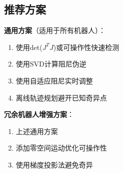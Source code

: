 \documentclass[12pt,a4paper]{article}
\begin{document}
\subsection{推荐方案}

\textbf{通用方案}（适用于所有机器人）：
\begin{enumerate}
\item 使用det($J^T J$)或可操作性快速检测
\item 使用SVD计算阻尼伪逆
\item 使用自适应阻尼实时调整
\item 离线轨迹规划避开已知奇异点
\end{enumerate}

\textbf{冗余机器人增强方案}：
\begin{enumerate}
\item 上述通用方案
\item 添加零空间运动优化可操作性
\item 使用梯度投影法避免奇异
\end{enumerate}
\end{document}
